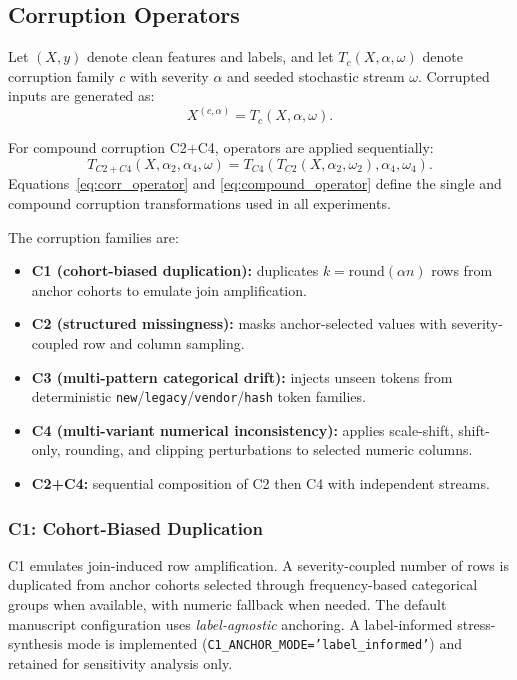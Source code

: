 \documentclass{AuthorGuide/ijitcs}
\begin{document}
\subsection{Corruption Operators}
Let $(X,y)$ denote clean features and labels, and let $T_c(X,\alpha,\omega)$ denote corruption family $c$ with severity $\alpha$ and seeded stochastic stream $\omega$. Corrupted inputs are generated as:
\begin{equation}
X^{(c,\alpha)} = T_c(X,\alpha,\omega).
\label{eq:corr_operator}
\end{equation}

For compound corruption C2+C4, operators are applied sequentially:
\begin{equation}
T_{C2+C4}(X,\alpha_{2},\alpha_{4},\omega)
=
T_{C4}\!\left(T_{C2}(X,\alpha_{2},\omega_{2}),\alpha_{4},\omega_{4}\right).
\label{eq:compound_operator}
\end{equation}
Equations~\eqref{eq:corr_operator} and \eqref{eq:compound_operator} define the single and compound corruption transformations used in all experiments.

The corruption families are:
\begin{itemize}
\item \textbf{C1 (cohort-biased duplication):} duplicates $k=\mathrm{round}(\alpha n)$ rows from anchor cohorts to emulate join amplification.
\item \textbf{C2 (structured missingness):} masks anchor-selected values with severity-coupled row and column sampling.
\item \textbf{C3 (multi-pattern categorical drift):} injects unseen tokens from deterministic \texttt{new}/\texttt{legacy}/\texttt{vendor}/\texttt{hash} token families.
\item \textbf{C4 (multi-variant numerical inconsistency):} applies scale-shift, shift-only, rounding, and clipping perturbations to selected numeric columns.
\item \textbf{C2+C4:} sequential composition of C2 then C4 with independent streams.
\end{itemize}

\subsubsection{C1: Cohort-Biased Duplication}
C1 emulates join-induced row amplification. A severity-coupled number of rows is duplicated from anchor cohorts selected through frequency-based categorical groups when available, with numeric fallback when needed. The default manuscript configuration uses \emph{label-agnostic} anchoring. A label-informed stress-synthesis mode is implemented (\texttt{C1\_ANCHOR\_MODE='label\_informed'}) and retained for sensitivity analysis only.
\end{document}
